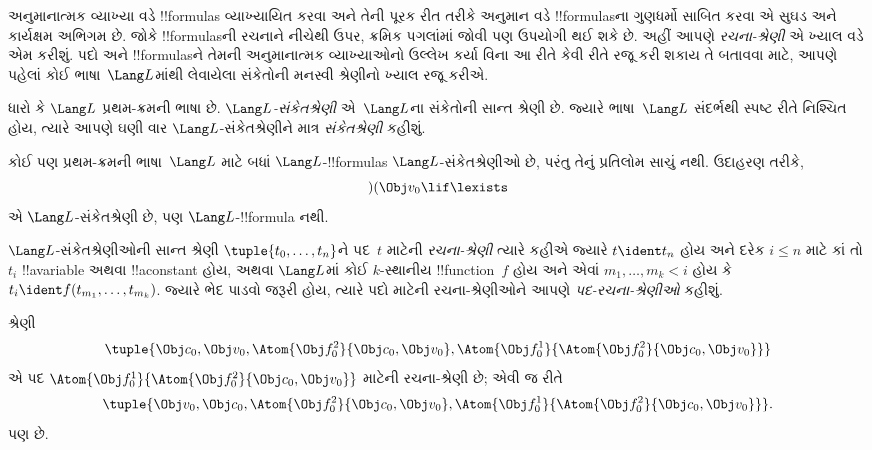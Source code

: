 \documentclass[../../../include/open-logic-section]{subfiles}
\begin{document}


અનુમાનાત્મક વ્યાખ્યા વડે !!{formula}s વ્યાખ્યાયિત કરવા અને તેની
પૂરક રીત તરીકે અનુમાન વડે !!{formula}sના ગુણધર્મો સાબિત કરવા એ
સુઘડ અને કાર્યક્ષમ અભિગમ છે. જોકે !!{formula}sની રચનાને નીચેથી ઉપર,
ક્રમિક પગલાંમાં જોવી પણ ઉપયોગી થઈ શકે છે. અહીં આપણે \emph{રચના-શ્રેણી}
એ ખ્યાલ વડે એમ કરીશું.
%
પદો અને !!{formula}sને તેમની અનુમાનાત્મક વ્યાખ્યાઓનો ઉલ્લેખ કર્યા વિના
આ રીતે કેવી રીતે રજૂ કરી શકાય તે બતાવવા માટે, આપણે પહેલાં કોઈ
ભાષા~$\Lang L$માંથી લેવાયેલા સંકેતોની મનસ્વી શ્રેણીનો ખ્યાલ રજૂ કરીએ.

\begin{defn}[સંકેતશ્રેણીઓ]
ધારો કે $\Lang L$ પ્રથમ-ક્રમની ભાષા છે. \emph{$\Lang L$-સંકેતશ્રેણી}
એ~$\Lang L$ના સંકેતોની સાન્ત શ્રેણી છે. જ્યારે ભાષા~$\Lang L$ સંદર્ભથી
સ્પષ્ટ રીતે નિશ્ચિત હોય, ત્યારે આપણે ઘણી વાર $\Lang L$-સંકેતશ્રેણીને
માત્ર \emph{સંકેતશ્રેણી} કહીશું.
\end{defn}

\begin{ex}
કોઈ પણ પ્રથમ-ક્રમની ભાષા~$\Lang L$ માટે બધાં $\Lang L$-!!{formula}s
$\Lang L$-સંકેતશ્રેણીઓ છે, પરંતુ તેનું પ્રતિલોમ સાચું નથી. ઉદાહરણ તરીકે,
\[)(\Obj v_0\lif\lexists\]
એ $\Lang L$-સંકેતશ્રેણી છે, પણ $\Lang L$-!!{formula} નથી.
\end{ex}

\begin{defn}[પદો માટેની રચના-શ્રેણીઓ]
$\Lang L$-સંકેતશ્રેણીઓની સાન્ત શ્રેણી $\tuple{t_0,\dotsc,t_n}$ને પદ~$t$
માટેની \emph{રચના-શ્રેણી} ત્યારે કહીએ જ્યારે $t \ident t_n$ હોય અને
દરેક $i \leq n$ માટે કાં તો $t_i$ !!a{variable} અથવા !!a{constant} હોય,
અથવા $\Lang L$માં કોઈ $k$-સ્થાનીય !!{function}~$f$ હોય અને એવાં
$m_1,\dotsc,m_k < i$ હોય કે
$t_i \ident f(t_{m_1},\dotsc,t_{m_k})$. જ્યારે ભેદ પાડવો જરૂરી હોય,
ત્યારે પદો માટેની રચના-શ્રેણીઓને આપણે \emph{પદ-રચના-શ્રેણીઓ} કહીશું.
\end{defn}

\begin{ex}
શ્રેણી
\[
    \tuple{\Obj c_0, \Obj v_0, \Atom{\Obj f^2_0}{\Obj c_0, \Obj v_0}, \Atom{\Obj f^1_0}{\Atom{\Obj f^2_0}{\Obj c_0, \Obj v_0}}}
\]
એ પદ $\Atom{\Obj f^1_0}{\Atom{\Obj f^2_0}{\Obj c_0, \Obj v_0}}$
માટેની રચના-શ્રેણી છે; એવી જ રીતે
\[
    \tuple{\Obj v_0, \Obj c_0, \Atom{\Obj f^2_0}{\Obj c_0, \Obj v_0}, \Atom{\Obj f^1_0}{\Atom{\Obj f^2_0}{\Obj c_0, \Obj v_0}}}.
\]
પણ છે.
\end{ex}
\end{document}
